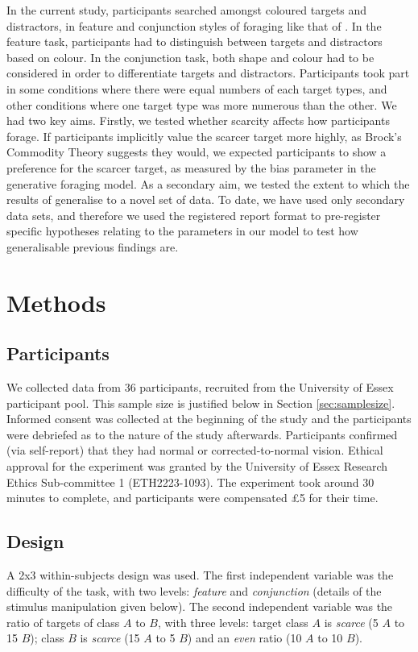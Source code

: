 \documentclass[12pt]{article}
\begin{document}
In the current study, participants searched amongst coloured targets and distractors, in feature and conjunction styles of foraging like that of \citep{kristjansson2014common}. In the feature task, participants had to distinguish between targets and distractors based on colour. In the conjunction task, both shape and colour had to be considered in order to differentiate targets and distractors. Participants took part in some conditions where there were equal numbers of each target types, and other conditions where one target type was more numerous than the other. We had two key aims. Firstly, we tested whether scarcity affects how participants forage. If participants implicitly value the scarcer target more highly, as Brock's Commodity Theory \citep{brock1968implications} suggests they would, we expected participants to show a preference for the scarcer target, as measured by the bias parameter in the generative foraging model. As a secondary aim, we tested the extent to which the results of \citep{clarke2022foraging} generalise to a novel set of data. To date, we have used only secondary data sets, and therefore we used the registered report format to pre-register specific hypotheses relating to the parameters in our model to test how generalisable previous findings are.

\section{Methods}

\subsection{Participants}
We collected data from 36 participants, recruited from the University of Essex participant pool. This sample size is justified below in Section \ref{sec:samplesize}. Informed consent was collected at the beginning of the study and the participants were debriefed as to the nature of the study afterwards. Participants confirmed (via self-report) that they had normal or corrected-to-normal vision. Ethical approval for the experiment was granted by the University of Essex Research Ethics Sub-committee 1 (ETH2223-1093). The experiment took around 30 minutes to complete, and participants were compensated £5 for their time.

\subsection{Design}
A 2x3 within-subjects design was used. The first independent variable was the difficulty of the task, with two levels: \textit{feature} and \textit{conjunction} (details of the stimulus manipulation given below). The second independent variable was the ratio of targets of class $A$ to $B$, with three levels: target class $A$ is \textit{scarce} (5 $A$ to 15 $B$); class $B$ is \textit{scarce} (15 $A$ to 5 $B$) and an \textit{even} ratio (10 $A$ to 10 $B$). 
\end{document}
